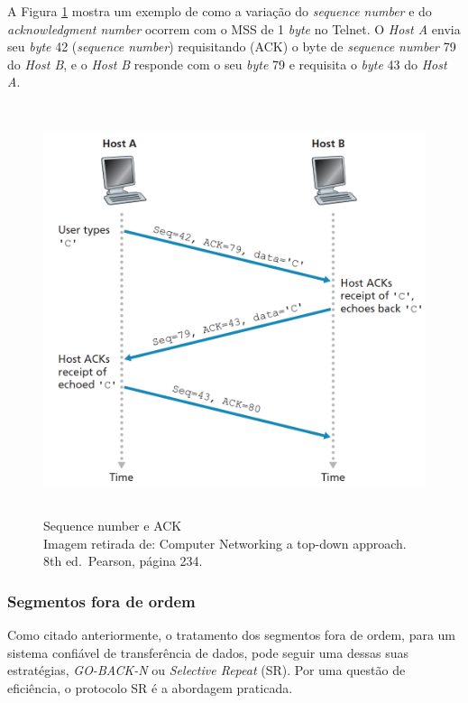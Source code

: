 A Figura \ref{Sequence number e ACK} mostra um exemplo de como a variação do \emph{sequence number} e do \emph{acknowledgment number} ocorrem com o MSS de 1
\emph{byte} no Telnet. O \emph{Host A} envia seu \emph{byte} 42
(\emph{sequence number}) requisitando (ACK) o byte de \emph{sequence
number} 79 do \emph{Host B}, e o \emph{Host B} responde com o seu
\emph{byte} 79 e requisita o \emph{byte} 43 do \emph{Host A}.


\begin{figure}[h!]
\centering
\includegraphics[keepaspectratio, width=15cm, height=12cm]{imagens/12/12 - troca de mensagens tcp.png}
\caption{Sequence number e ACK \\
Imagem retirada de: Computer Networking a top-down approach. 8th
ed.~Pearson, página 234. \\}
\label{Sequence number e ACK}
\end{figure}



\hypertarget{segmentos-fora-de-ordem}{%
\subsubsection{Segmentos fora de ordem}\label{segmentos-fora-de-ordem}}

Como citado anteriormente, o tratamento dos segmentos fora de ordem,
para um sistema confiável de transferência de dados, pode seguir uma
dessas suas estratégias, \emph{GO-BACK-N} ou \emph{Selective Repeat}
(SR). Por uma questão de eficiência, o protocolo SR é a abordagem
praticada.

